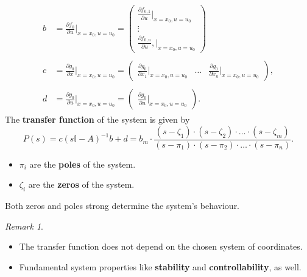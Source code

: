 \documentclass[a4paper,12 pt]{article}
\numberwithin{equation}{section}
\theoremstyle{definition}
\theoremstyle{remark}
\newtheorem*{bmk}{Remark}
\theoremstyle{definition}
\theoremstyle{definition}
\theoremstyle{definition}
\theoremstyle{remark}
\begin{document}
 \begin{eqnarray*}
\begin{split}
b &= \frac{\partial f_0}{\partial u}\Big\vert_{x=x_0,u=u_0} = \begin{pmatrix} \frac{\partial f_{0,1}}{\partial u}\Big\vert_{x=x_0,u=u_0}\\ \vdots \\ \frac{\partial f_{0,n}}{\partial u},\Big\vert_{x=x_0,u=u_0}\end{pmatrix}
\\ \\
 c &= \frac{\partial g_0}{\partial x}\Big\vert_{x=x_0,u=u_0} = \begin{pmatrix} \frac{\partial g_0}{\partial x_1}\Big\vert_{x=x_0,u=u_0}& \dots & \frac{\partial g_0}{\partial x_n}\Big\vert_{x=x_0,u=u_0}\end{pmatrix},
\\ \\
 d &=\frac{\partial g_0}{\partial u}\Big\vert_{x=x_0,u=u_0} = \begin{pmatrix}\frac{\partial g_0}{\partial u}\Big\vert_{x=x_0,u=u_0}\end{pmatrix}.
\end{split}
 \end{eqnarray*}
The \textbf{transfer function} of the system is given by
  \begin{equation}P(s)=c(s\mathbb{I}-A)^{-1}b+d=b_m\cdot \frac{(s-\zeta_1)\cdot (s-\zeta_2)\cdot \hdots \cdot (s-\zeta_m)}{(s-\pi_1)\cdot (s-\pi_2)\cdot \hdots \cdot (s-\pi_n)}.\end{equation}
  \begin{itemize}
  \item $\pi_i$ are the \textbf{poles} of the system.
  \item $\zeta_i$ are the \textbf{zeros} of the system.
  \end{itemize}
    Both zeros and poles strong determine the system's behaviour.

 
  \begin{bmk} \
  \begin{itemize}
  \item The transfer function does not depend on the chosen system of coordinates.
  \item Fundamental system properties like \textbf{stability} and \textbf{controllability}, as well.
  \end{itemize}

  \end{bmk}
  
\end{document}
